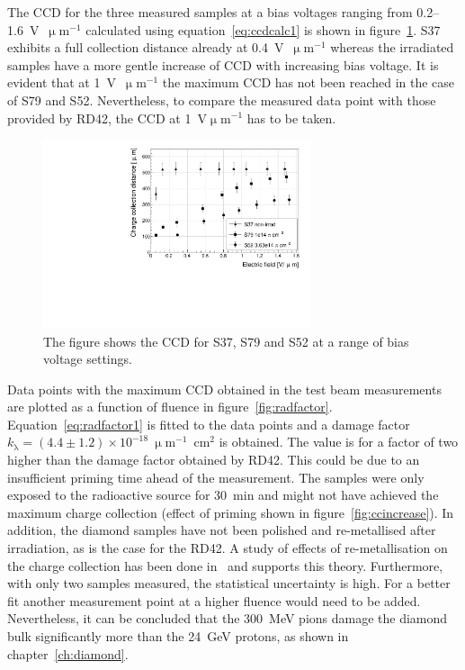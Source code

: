 The CCD for the three measured samples at a bias voltages ranging from 0.2--1.6~V~$\upmu$m$^{-1}$ calculated using equation~\ref{eq:ccdcalc1} is shown in figure~\ref{fig:ccd}. S37 exhibits a full collection distance already at 0.4~V~$\upmu$m$^{-1}$ whereas the irradiated samples have a more gentle increase of CCD with increasing bias voltage. It is evident that at 1~V~$\upmu$m$^{-1}$  the maximum CCD has not been reached in the case of S79 and S52. Nevertheless, to compare the measured data point with those provided by RD42, the CCD at 1~V$\upmu$m$^{-1}$ has to be taken.

\begin{figure}[!t]
\begin{center}
\includegraphics[width=0.7\textwidth]{03_measurement_results/scripts/plots/ccd}
\caption{The figure shows the CCD for S37, S79 and S52 at a range of bias voltage settings.}
\label{fig:ccd}
\end{center}
\end{figure}

Data points with the maximum CCD obtained in the test beam measurements are plotted as a function of fluence in figure~\ref{fig:radfactor}. Equation~\ref{eq:radfactor1} is fitted to the data points and a damage factor $k_{\mathrm{\lambda}}=(4.4\pm1.2)\times10^{-18}~\upmu$m$^{-1}$~cm$^{2}$ is obtained. The value is for a factor of two higher than the damage factor obtained by RD42. %
This could be due to an insufficient priming time ahead of the measurement. The samples were only exposed to the radioactive source for 30~min and might not have achieved the maximum charge collection (effect of priming shown in figure~\ref{fig:ccincrease}). In addition, the diamond samples have not been polished and re-metallised after irradiation, as is the case for the RD42. A study of effects of re-metallisation on the charge collection has been done in~\cite{pomorski2008electronic} and supports this theory. Furthermore, with only two samples measured, the statistical uncertainty is high. For a better fit another measurement point at a higher fluence would need to be added. Nevertheless, it can be concluded that the 300~MeV pions damage the diamond bulk significantly more than the 24~GeV protons, as shown in chapter~\ref{ch:diamond}.


